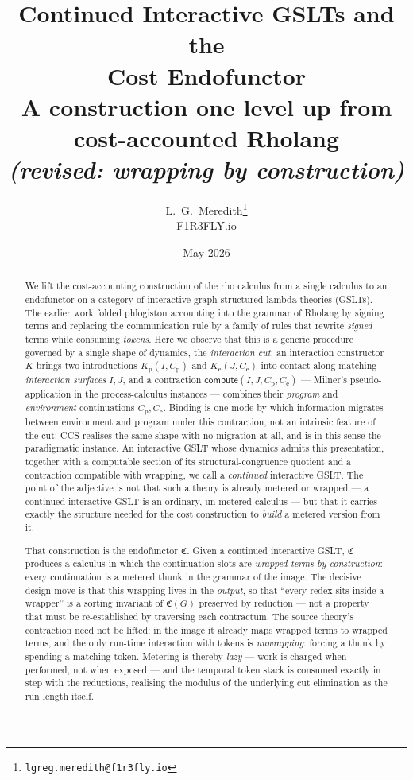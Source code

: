 \documentclass[11pt]{article}
\title{\textbf{Continued Interactive GSLTs and the\\[2pt]
Cost Endofunctor}\\[6pt]
\large A construction one level up from cost-accounted Rholang\\[2pt]
\normalsize\textit{(revised: wrapping by construction)}}
\author{L.~G.~Meredith\thanks{\texttt{lgreg.meredith@f1r3fly.io}}\\[2pt]
\small F1R3FLY.io}
\date{May 2026}
\theoremstyle{definition}
\theoremstyle{plain}
\newcommand{\Cost}{\mathfrak{C}}              %
\newcommand{\compute}{\mathsf{compute}}
\newcommand{\Kp}{K_{\mathrm{p}}}
\newcommand{\Ke}{K_{\mathrm{e}}}
\begin{document}
\maketitle

\begin{abstract}
We lift the cost-accounting construction of the rho calculus from a
single calculus to an endofunctor on a category of interactive
graph-structured lambda theories (GSLTs). The earlier work folded
phlogiston accounting into the grammar of Rholang by signing terms and
replacing the communication rule by a family of rules that rewrite
\emph{signed} terms while consuming \emph{tokens}. Here we observe that
this is a generic procedure governed by a single shape of dynamics, the
\emph{interaction cut}: an interaction constructor $K$ brings two
introductions $\Kp(I,C_{\mathrm p})$ and $\Ke(J,C_{\mathrm e})$ into
contact along matching \emph{interaction surfaces} $I, J$, and a
contraction $\compute(I,J,C_{\mathrm p},C_{\mathrm e})$ --- Milner's
pseudo-application in the process-calculus instances --- combines their
\emph{program} and \emph{environment} continuations
$C_{\mathrm p}, C_{\mathrm e}$. Binding is one mode by which information
migrates between environment and program under this contraction, not an
intrinsic feature of the cut: CCS realises the same shape with no
migration at all, and is in this sense the paradigmatic instance. An
interactive GSLT whose dynamics
admits this presentation, together with a computable section of its
structural-congruence quotient and a contraction compatible with
wrapping, we call a \emph{continued} interactive GSLT. The point of the
adjective is not that such a theory is already metered or wrapped --- a
continued interactive GSLT is an ordinary, un-metered calculus --- but
that it carries exactly the structure needed for the cost construction
to \emph{build} a metered version from it.

That construction is the endofunctor $\Cost$. Given a continued
interactive GSLT, $\Cost$ produces a calculus in which the continuation
slots are \emph{wrapped terms by construction}: every continuation is a
metered thunk in the grammar of the image. The decisive design move is
that this wrapping lives in the \emph{output}, so that ``every redex sits
inside a wrapper'' is a sorting invariant of $\Cost(G)$ preserved by
reduction --- not a property that must be re-established by traversing
each contractum. The source theory's contraction need not be lifted; in
the image it already maps wrapped terms to wrapped terms, and the only
run-time interaction with tokens is \emph{unwrapping}: forcing a thunk by
spending a matching token. Metering is thereby \emph{lazy} --- work is
charged when performed, not when exposed --- and the temporal token stack
is consumed exactly in step with the reductions, realising the modulus of
the underlying cut elimination as the run length itself.


\end{abstract}
\end{document}
